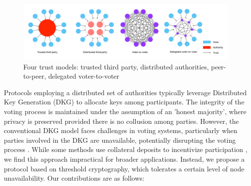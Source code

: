 \documentclass[runningheads]{llncs}
\begin{document}
\begin{figure}
    \centering
    \includegraphics[width=\textwidth]{trust-models-voting.pdf}
    \caption{Four trust models: trusted third party, distributed authorities, peer-to-peer, delegated voter-to-voter}
    \label{fig:trust-models}
\end{figure}

Protocols employing a distributed set of authorities typically leverage Distributed Key Generation (DKG) \cite{gennaroSecureDistributedKey1999} to allocate keys among participants. The integrity of the voting process is maintained under the assumption of an 'honest majority', where privacy is preserved provided there is no collusion among parties. However, the conventional DKG model faces challenges in voting systems, particularly when parties involved in the DKG are unavailable, potentially disrupting the voting process \cite{haoAnonymousVotingTworound2010}. While some methods use collateral deposits to incentivize participation \cite{elsheikhDisputefreeScalableOpen2022}, we find this approach impractical for broader applications. Instead, we propose a protocol based on threshold cryptography, which tolerates a certain level of node unavailability. Our contributions are as follows:
\end{document}

